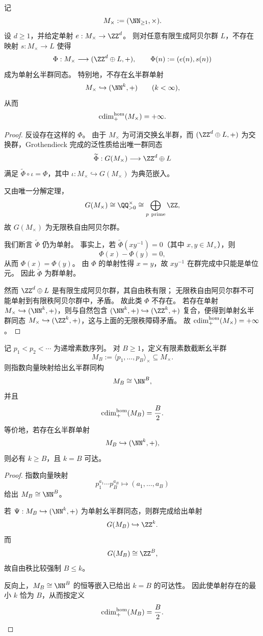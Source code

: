 \begin{theorem}[乘法对象的有限维同态账本障碍]\label{thm:cdim-multiplicative-object-no-finite-hom-ledger}
记
\[
M_\times:=(\NN_{\ge 1},\times).
\]
设 \(d\ge 1\)，并给定单射 \(e:M_\times\to\ZZ^d\)。
则对任意有限生成阿贝尔群 \(L\)，不存在映射 \(s:M_\times\to L\) 使得
\[
\Phi:M_\times\longrightarrow (\ZZ^d\oplus L,+),
\qquad
\Phi(n):=(e(n),s(n))
\]
成为单射幺半群同态。
特别地，不存在幺半群单射
\[
M_\times\hookrightarrow (\NN^k,+)\qquad(k<\infty),
\]
从而
\[
\operatorname{cdim}^{\mathrm{hom}}_{+}(M_\times)=+\infty.
\]
\end{theorem}
\begin{proof}
反设存在这样的 \(\Phi\)。
由于 \(M_\times\) 为可消交换幺半群，而 \((\ZZ^d\oplus L,+)\) 为交换群，Grothendieck 完成的泛性质给出唯一群同态
\[
\widetilde\Phi:G(M_\times)\longrightarrow \ZZ^d\oplus L
\]
满足 \(\widetilde\Phi\circ\iota=\Phi\)，其中 \(\iota:M_\times\hookrightarrow G(M_\times)\) 为典范嵌入。

又由唯一分解定理，
\[
G(M_\times)\cong \QQ_{>0}^{\times}\cong \bigoplus_{p\ \mathrm{prime}}\ZZ,
\]
故 \(G(M_\times)\) 为无限秩自由阿贝尔群。

我们断言 \(\widetilde\Phi\) 仍为单射。
事实上，若 \(\widetilde\Phi(xy^{-1})=0\)（其中 \(x,y\in M_\times\)），则
\[
\Phi(x)-\Phi(y)=0,
\]
从而 \(\Phi(x)=\Phi(y)\)。
由 \(\Phi\) 的单射性得 \(x=y\)，故 \(xy^{-1}\) 在群完成中只能是单位元。
因此 \(\widetilde\Phi\) 为群单射。

然而 \(\ZZ^d\oplus L\) 是有限生成阿贝尔群，其自由秩有限；
无限秩自由阿贝尔群不可能单射到有限秩阿贝尔群中，矛盾。
故此类 \(\Phi\) 不存在。
若存在单射 \(M_\times\hookrightarrow(\NN^k,+)\)，则与自然包含 \((\NN^k,+)\hookrightarrow(\ZZ^k,+)\) 复合，便得到单射幺半群同态 \(M_\times\hookrightarrow(\ZZ^k,+)\)，这与上面的无限秩障碍矛盾。
故 \(\operatorname{cdim}^{\mathrm{hom}}_{+}(M_\times)=+\infty\)。
\end{proof}

\begin{corollary}[有限素数截断的精确同态半圆维]\label{cor:cdim-finite-prime-truncation-hom-half-circle}
记 \(p_1<p_2<\cdots\) 为递增素数序列。
对 \(B\ge 1\)，定义有限素数截断幺半群
\[
M_B:=\langle p_1,\dots,p_B\rangle_{\times}\subseteq M_\times.
\]
则指数向量映射给出幺半群同构
\[
M_B\cong \NN^B,
\]
并且
\[
\operatorname{cdim}^{\mathrm{hom}}_{+}(M_B)=\frac{B}{2}.
\]
等价地，若存在幺半群单射
\[
M_B\hookrightarrow (\NN^k,+),
\]
则必有 \(k\ge B\)，且 \(k=B\) 可达。
\end{corollary}
\begin{proof}
指数向量映射
\[
p_1^{a_1}\cdots p_B^{a_B}\longmapsto (a_1,\dots,a_B)
\]
给出 \(M_B\cong \NN^B\)。

若 \(\Psi:M_B\hookrightarrow(\NN^k,+)\) 为单射幺半群同态，则群完成给出单射
\[
G(M_B)\hookrightarrow \ZZ^k.
\]
而
\[
G(M_B)\cong \ZZ^B,
\]
故自由秩比较强制 \(B\le k\)。

反向上，\(M_B\cong \NN^B\) 的恒等嵌入已给出 \(k=B\) 的可达性。
因此使单射存在的最小 \(k\) 恰为 \(B\)，从而按定义
\[
\operatorname{cdim}^{\mathrm{hom}}_{+}(M_B)=\frac{B}{2}.
\]
\end{proof}

